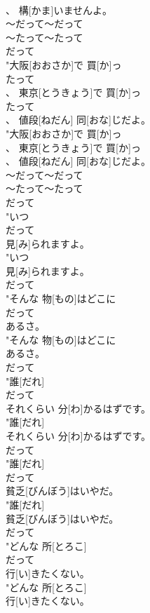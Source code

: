 \documentclass[8pt]{extreport}
\begin{document}
\begin{CJK}{UTF8}{min}
\\	、 構[かま]いませんよ。
\\	～だって～だって 
\\	～たって～たって 
\\	だって
\\	"大阪[おおさか]で 買[か]っ
\\	たって
\\	、 東京[とうきょう]で 買[か]っ
\\	たって
\\	、 値段[ねだん] 同[おな]じだよ。
\\	"大阪[おおさか]で 買[か]っ
\\	、 東京[とうきょう]で 買[か]っ
\\	、 値段[ねだん] 同[おな]じだよ。
\\	～だって～だって 
\\	～たって～たって 
\\	だって
\\	"いつ
\\	だって
\\	見[み]られますよ。
\\	"いつ
\\	見[み]られますよ。
\\	だって
\\	"そんな 物[もの]はどこに
\\	だって
\\	あるさ。
\\	"そんな 物[もの]はどこに
\\	あるさ。
\\	だって
\\	"誰[だれ]
\\	だって
\\	それくらい 分[わ]かるはずです。
\\	"誰[だれ]
\\	それくらい 分[わ]かるはずです。
\\	だって
\\	"誰[だれ]
\\	だって
\\	貧乏[びんぼう]はいやだ。
\\	"誰[だれ]
\\	貧乏[びんぼう]はいやだ。
\\	だって
\\	"どんな 所[とろこ]
\\	だって
\\	行[い]きたくない。
\\	"どんな 所[とろこ]
\\	行[い]きたくない。

\end{CJK}
\end{document}
